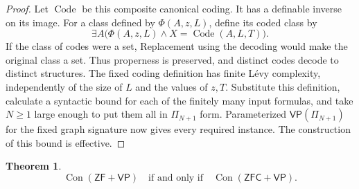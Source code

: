 \documentclass[11pt,a4paper]{amsart}
\newcommand{\VP}{\mathsf{VP}}
\newcommand{\ZF}{\mathsf{ZF}}
\newcommand{\ZFC}{\mathsf{ZFC}}
\newcommand{\Con}{\operatorname{Con}}
\theoremstyle{plain}
\newtheorem{theorem}{Theorem}[section]
\theoremstyle{definition}
\theoremstyle{remark}
\begin{document}
\begin{proof}
Let $\operatorname{Code}$ be this composite canonical coding.
It has a definable inverse on its image.  For a class defined by
$\Phi(A,z,L)$, define its coded class by
\[
\exists A\bigl(\Phi(A,z,L)\land
                       X=\operatorname{Code}(A,L,T)\bigr).
\]
If the class of codes were a set, Replacement using the decoding
would make the original class a set.  Thus properness is
preserved, and distinct codes decode to distinct structures.
The fixed coding definition has finite L\'evy complexity,
independently of the size of $L$ and the values of $z,T$.
Substitute this definition, calculate a syntactic bound for
each of the finitely many input formulas, and take $N\geq1$
large enough to put them all in $\Pi_{N+1}$ form.
Parameterized $\VP(\Pi_{N+1})$ for the fixed graph signature
now gives every required instance.  The construction of this
bound is effective.
\end{proof}
\endgroup

\begin{theorem}\label{thm:consistency-transfer}
\[
\Con(\ZF+\VP)\quad\text{if and only if}\quad\Con(\ZFC+\VP).
\]
\end{theorem}
\end{document}
